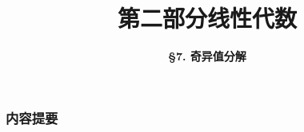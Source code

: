 



\title[Linear Algebra]{\LARGE \bfseries 第二部分\quad 线性代数} %
\author[SVD] %
{\Large \bfseries \S 7. 奇异值分解}
\date{}






\begin{frame}

\titlepage %

\end{frame}


\begin{frame}
\frametitle{内容提要} %
\tableofcontents %
\end{frame}


